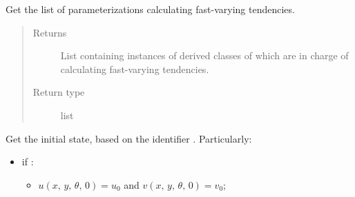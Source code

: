 \documentclass[letterpaper,10pt,english]{sphinxmanual}
\begin{document}
\begin{fulllineitems}
\begin{fulllineitems}
\begin{quote}
\begin{description}
\begin{itemize}
\begin{itemize}
\end{itemize}

\end{itemize}


\end{description}\end{quote}

\end{fulllineitems}


\begin{fulllineitems}
\label{\detokenize{api:tasmania.dycore.dycore_isentropic.DynamicalCoreIsentropic.fast_tendency_parameterizations}}
Get the list of parameterizations calculating fast-varying tendencies.
\begin{quote}\begin{description}
\item[{Returns}] \leavevmode
List containing instances of derived classes of
{\hyperref[\detokenize{api:tasmania.parameterizations.fast_tendencies.FastTendency}]{}} which are in charge of
calculating fast-varying tendencies.

\item[{Return type}] \leavevmode
list

\end{description}\end{quote}

\end{fulllineitems}


\begin{fulllineitems}
\label{\detokenize{api:tasmania.dycore.dycore_isentropic.DynamicalCoreIsentropic.get_initial_state}}
Get the initial state, based on the identifier . Particularly:
\begin{itemize}
\item {} 
if :
\begin{itemize}
\item {} 
\(u(x, \, y, \, \theta, \, 0) = u_0\) and \(v(x, \, y, \, \theta, \, 0) = v_0\);


\end{itemize}
\end{itemize}
\end{fulllineitems}
\end{fulllineitems}
\end{document}
